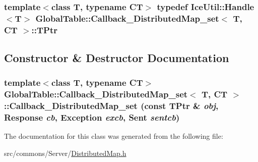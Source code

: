 \label{class_global_table_1_1_callback___distributed_map__set_acb1788ee23e85c2b36536177fc33e7d7}
\hypertarget{class_global_table_1_1_callback___distributed_map__set_a3b50a68a36ed6f9c18c2f43921e7d2e9}{
\subsubsection[{TPtr}]{\setlength{\rightskip}{0pt plus 5cm}template$<$class T, typename CT$>$ typedef IceUtil::Handle$<$T$>$ {\bf GlobalTable::Callback\_\-DistributedMap\_\-set}$<$ T, CT $>$::{\bf TPtr}}}
\label{class_global_table_1_1_callback___distributed_map__set_a3b50a68a36ed6f9c18c2f43921e7d2e9}


\subsection{Constructor \& Destructor Documentation}
\hypertarget{class_global_table_1_1_callback___distributed_map__set_af55744d73b91381c76820d544ce6a292}{
\subsubsection[{Callback\_\-DistributedMap\_\-set}]{\setlength{\rightskip}{0pt plus 5cm}template$<$class T, typename CT$>$ {\bf GlobalTable::Callback\_\-DistributedMap\_\-set}$<$ T, CT $>$::{\bf Callback\_\-DistributedMap\_\-set} (const {\bf TPtr} \& {\em obj}, \/  {\bf Response} {\em cb}, \/  {\bf Exception} {\em excb}, \/  {\bf Sent} {\em sentcb})}}
\label{class_global_table_1_1_callback___distributed_map__set_af55744d73b91381c76820d544ce6a292}


The documentation for this class was generated from the following file:\begin{DoxyCompactItemize}
\item 
src/commons/Server/\hyperlink{_distributed_map_8h}{DistributedMap.h}\end{DoxyCompactItemize}
